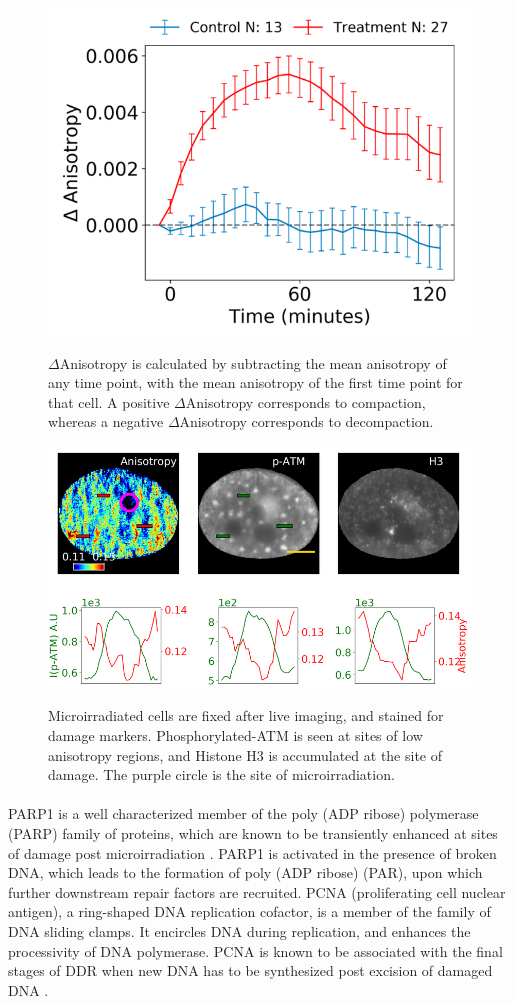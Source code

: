 \begin{figure}[H]
    {\hfill\includegraphics[clip, width=0.5\linewidth]{figures/timetrace.png}\hspace*{\fill}}
    \caption{$\Delta$Anisotropy is calculated by subtracting the mean anisotropy of any time point, with the mean anisotropy of the first time point for that cell. A positive $\Delta$Anisotropy corresponds to compaction, whereas a negative $\Delta$Anisotropy corresponds to decompaction.}
    {\label{fig:timetrace}}
\end{figure}

\begin{figure}[H]
    {\hfill\includegraphics[clip, width=1\linewidth]{figures/patm.png}\hspace*{\fill}}
    \caption{Microirradiated cells are fixed after live imaging, and stained for damage markers. Phosphorylated-ATM is seen at sites of low anisotropy regions, and Histone H3 is accumulated at the site of damage. The purple circle is the site of microirradiation.}
    {\label{fig:patm}}
\end{figure}

\paragraph*{} PARP1 is a well characterized member of the poly (ADP ribose) polymerase (PARP) family of proteins, which are known to be transiently enhanced at sites of damage post microirradiation \cite{chou2010chromatin, qi2019multiple}. PARP1 is activated in the presence of broken DNA, which leads to the formation of poly (ADP ribose) (PAR), upon which further downstream repair factors are recruited. PCNA (proliferating cell nuclear antigen), a ring-shaped DNA replication cofactor, is a member of the family of DNA sliding clamps. It encircles DNA during replication, and enhances the processivity of DNA polymerase. PCNA is known to be associated with the final stages of DDR when new DNA has to be synthesized post excision of damaged DNA \cite{moldovan2007pcna}.

